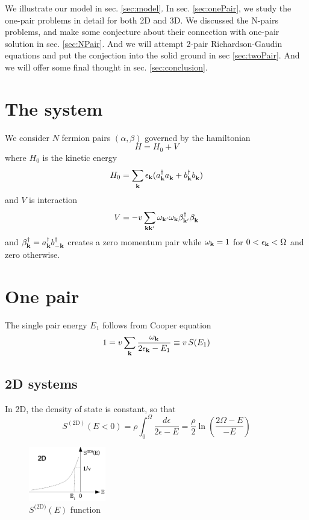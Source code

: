 \documentclass{article}
\newcommand{\td}{{\ensuremath{{\text{(2D)}}}}}
\begin{document}
We illustrate our model in sec. \ref{sec:model}.  In sec. \ref{sec:onePair}, we study the one-pair problems in detail for both 2D and 3D.  We discussed the N-pairs problems, and make some conjecture about their connection with one-pair solution  in sec. \ref{sec:NPair}.  And we will attempt 2-pair Richardson-Gaudin equations and put the conjection into the solid ground in sec \ref{sec:twoPair}.  And we will offer some final thought in sec. \ref{sec:conclusion}.
\section{The system\label{sec:model}}
We consider $N$ fermion pairs $(\alpha,\beta)$ governed by the hamiltonian
\begin{equation}
H=H_{0}+V
\end{equation}
where $H_0$ is the kinetic energy 
\begin{equation}
H_0=\sum_{\mathbf{k}}\epsilon_{\mathbf{k}}(a^\dagger_{\mathbf{k}}{}a^{}_{\mathbf{k}}+b^\dagger_{\mathbf{k}}{}b^{}_{\mathbf{k}})
\label{eq:}
\end{equation}
and $V$ is interaction
\begin{equation}
V=-v\sum_{\mathbf{k}\mathbf{k}'}\omega_{\mathbf{k}'}\omega_{\mathbf{k}}\beta^\dagger_{\mathbf{k}'}{}\beta^{}_{\mathbf{k}}
\label{eq:VBcs}
\end{equation}
and $\beta^\dagger_{\mathbf{k}}=a^\dagger_{\mathbf{k}}b^\dagger_{-\mathbf{k}}$ creates a zero momentum pair while $\omega_{\mathbf{k}}=1$ for $0<\epsilon_{\mathbf{k}}<\Omega$ and zero otherwise.  
\section{One pair\label{sec:onePair}}
The single pair energy $E_1$ follows from Cooper equation
\begin{equation}
1=v\sum_{\mathbf{k}}\frac{\omega_{\mathbf{k}}}{2\epsilon_{\mathbf{k}}-E_1}\equiv{}v\,S(E_1)
\label{eq:}
\end{equation}
\subsection{2D systems}
In 2D, the density of state is constant, so that 
\begin{equation}
S^{(\text{2D})}(E<0)=\rho\int_0^{\Omega}\frac{d\epsilon}{2\epsilon-E}=\frac{\rho}{2}\ln\left(\frac{2\Omega-E}{-E}\right)
\label{eq:}
\end{equation}
\begin{figure}[htbp]
	\centering
		\includegraphics[width=0.30\textwidth]{2dOnePair.eps}
	\caption{$S^\td(E)$ function}
	\label{fig:2dOnePair}
\end{figure}
\end{document}
